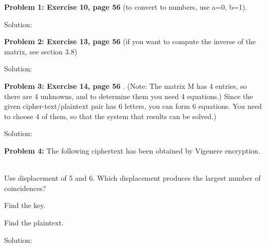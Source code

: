 \documentclass[12pt,letterpaper,final]{report}
\begin{document}

\vline


\noindent\textbf{Problem 1: Exercise 10, page 56}
 (to convert to numbers, use a=0, b=1).

\bigskip  Solution: 

\bigskip
\noindent\textbf{Problem 2: Exercise 13, page 56} (if you want to compute the inverse of the matrix, see section 3.8)

\bigskip Solution: 


\bigskip
\noindent\textbf{Problem 3: Exercise 14, page 56} . (Note: The matrix M has 4 entries, so there are 4 unknowns, and to determine them you need 4 equations.) 
Since the given cipher-text/plaintext pair has 6 letters, you can form 6 equations. You need to choose 4 of them, so that the system that results can be solved.)

\bigskip Solution: 

\bigskip
\noindent\textbf{Problem 4:} The following ciphertext has been obtained by Vigenere encryption.\\\\

\bigskip
{}
\begin{alphalist}
	\item Use displacement of 5 and 6. Which displacement produces the largest number of coincidences?
	\item Find the key.
	\item Find the plaintext.
\end{alphalist}

\bigskip
\indent Solution: 
\end{document}

